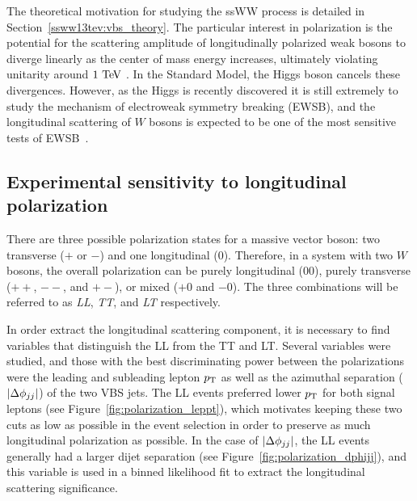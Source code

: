The theoretical motivation for studying the ssWW process is detailed in Section~\ref{ssww13tev:vbs_theory}.
The particular interest in polarization is the potential for the scattering amplitude of longitudinally polarized weak bosons to diverge linearly as the center of mass energy increases, ultimately violating unitarity around $1\tev$ \cite{1977.ben-lee-weak-interactions}.
In the Standard Model, the Higgs boson cancels these divergences.
However, as the Higgs is recently discovered it is still extremely to study the mechanism of electroweak symmetry breaking (EWSB), and the longitudinal scattering of $W$ bosons is expected to be one of the most sensitive tests of EWSB~\cite{2013.longitudinal-theory}.


\subsection{Experimental sensitivity to longitudinal polarization}\label{sec:sswwupgrade_longitudinal_sens}
There are three possible polarization states for a massive vector boson: two transverse ($+$ or $-$) and one longitudinal ($0$).
Therefore, in a system with two $W$ bosons, the overall polarization can be purely longitudinal ($00$), purely transverse ($++$, $--$, and $+-$), or mixed ($+0$ and $-0$).
The three combinations will be referred to as \emph{LL}, \emph{TT}, and \emph{LT} respectively.

In order extract the longitudinal scattering component, it is necessary to find variables that distinguish the LL from the TT and LT.
Several variables were studied, and those with the best discriminating power between the polarizations were the leading and subleading lepton $p_{\mathrm{T}}$ as well as the azimuthal separation ($|\Delta\phi_{jj}|$) of the two VBS jets.
The LL events preferred lower $p_{\mathrm{T}}$ for both signal leptons (see Figure~\ref{fig:polarization_leppt}), which motivates keeping these two cuts as low as possible in the event selection in order to preserve as much longitudinal polarization as possible.
In the case of $|\Delta\phi_{jj}|$, the LL events generally had a larger dijet separation (see Figure~\ref{fig:polarization_dphijj}), and this variable is used in a binned likelihood fit to extract the longitudinal scattering significance.

